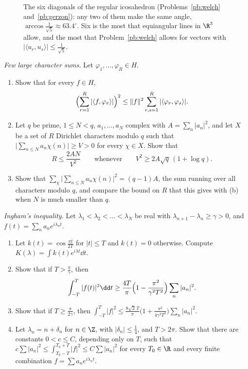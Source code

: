 \begin{figure}[ht]
\centering
{}
\caption{The six diagonals of the regular icosahedron (Problems~\ref{pb:welch} and~\ref{pb:gerzon}): any two of them make the same angle,
$\arccos\frac1{\sqrt5}\approx63.4^\circ$. Six is the most that equiangular lines in $\R^3$ allow, and the most that Problem~\ref{pb:welch}
allows for vectors with $|\langle u_r,u_s\rangle|\le\frac1{\sqrt5}$.}\label{fig:icosa}
\end{figure}

\begin{exercise}[$\star\star$]\label{pb:halasz}
\emph{Few large character sums.} Let $\varphi_1,\dots,\varphi_R\in H$.
\begin{enumerate}[label=(\alph*)]
\item Show that for every $f\in H$,
\[
\Bigl(\sum_{r=1}^R|\langle f,\varphi_r\rangle|\Bigr)^2\le\|f\|^2\sum_{r,s=1}^R|\langle\varphi_r,\varphi_s\rangle|.
\]
\item Let $q$ be prime, $1\le N<q$, $a_1,\dots,a_N$ complex with $A=\sum_n|a_n|^2$, and let $X$ be a set of $R$ Dirichlet characters modulo $q$ such
that $\bigl|\sum_{n\le N}a_n\chi(n)\bigr|\ge V>0$ for every $\chi\in X$. Show that
\[
R\le\frac{2AN}{V^2}\qquad\text{whenever}\qquad V^2\ge2A\sqrt q\,(1+\log q).
\]
\item Show that $\sum_\chi\bigl|\sum_{n\le N}a_n\chi(n)\bigr|^2=(q-1)A$, the sum running over all characters modulo $q$, and compare the bound on $R$ that this
gives with (b) when $N$ is much smaller than $q$.
\end{enumerate}
\end{exercise}

\begin{exercise}[$\star\star\star$]\label{pb:ingham}
\emph{Ingham's inequality.} Let $\lambda_1<\lambda_2<\dots<\lambda_N$ be real with $\lambda_{n+1}-\lambda_n\ge\gamma>0$, and $f(t)=\sum_na_ne^{i\lambda_nt}$.
\begin{enumerate}[label=(\alph*)]
\item Let $k(t)=\cos\frac{\pi t}{2T}$ for $|t|\le T$ and $k(t)=0$ otherwise. Compute $K(\lambda)=\int k(t)e^{i\lambda t}\dd t$.
\item Show that if $T>\frac\pi\gamma$, then
\[
\int_{-T}^T|f(t)|^2\dd t\ge\frac{4T}\pi\Bigl(1-\frac{\pi^2}{\gamma^2T^2}\Bigr)\sum_n|a_n|^2.
\]
\item Show that if $T\ge\frac\pi{2\gamma}$, then $\int_{-T}^T|f|^2\le\frac{8\sqrt2\,T}\pi\bigl(1+\frac{\pi^2}{4\gamma^2T^2}\bigr)\sum_n|a_n|^2$.
\item Let $\lambda_n=n+\delta_n$ for $n\in\Z$, with $|\delta_n|\le\frac14$, and $T>2\pi$. Show that there are constants $0<c\le C$, depending only on $T$,
such that $c\sum|a_n|^2\le\int_{T_0-T}^{T_0+T}|f|^2\le C\sum|a_n|^2$ for every $T_0\in\R$ and every finite combination $f=\sum a_ne^{i\lambda_nt}$.
\end{enumerate}
\end{exercise}

